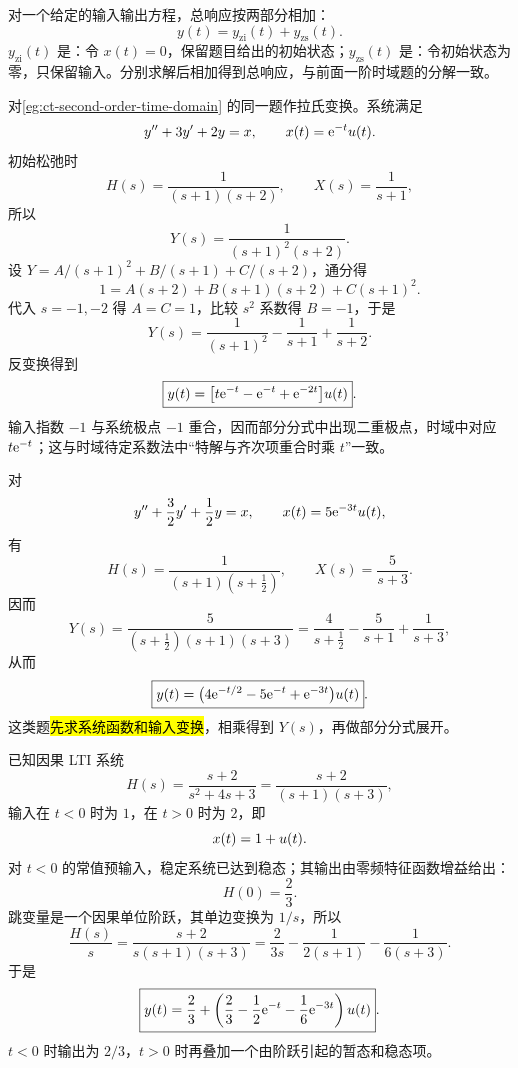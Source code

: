 对一个给定的输入输出方程，总响应按两部分相加：
\begin{equation}
  y(t)=y_{\mathrm{zi}}(t)+y_{\mathrm{zs}}(t).
  \label{eq:laplace-total-response-split}
\end{equation}
$y_{\mathrm{zi}}(t)$ 是：令 $x(t)=0$，保留题目给出的初始状态；$y_{\mathrm{zs}}(t)$ 是：令初始状态为零，只保留输入。分别求解后相加得到总响应，与前面一阶时域题的分解一致。

\begin{example}[重复极点的零状态响应]
\label{eg:laplace-repeated-pole-response}
  对\cref{eg:ct-second-order-time-domain} 的同一题作拉氏变换。系统满足
  \[
    y''+3y'+2y=x,\qquad
    x(t)=\mathrm{e}^{-t}u(t).
  \]
  初始松弛时
  \[
    H(s)=\frac{1}{(s+1)(s+2)},\qquad
    X(s)=\frac{1}{s+1},
  \]
  所以
  \[
    Y(s)=\frac{1}{(s+1)^2(s+2)}.
  \]
  设 $Y=A/(s+1)^2+B/(s+1)+C/(s+2)$，通分得
  \[
    1=A(s+2)+B(s+1)(s+2)+C(s+1)^2.
  \]
  代入 $s=-1,-2$ 得 $A=C=1$，比较 $s^2$ 系数得 $B=-1$，于是
  \[
    Y(s)=\frac{1}{(s+1)^2}-\frac{1}{s+1}+\frac{1}{s+2}.
  \]
  反变换得到
  \[
    \boxed{
    y(t)=\bigl[t\mathrm{e}^{-t}-\mathrm{e}^{-t}+\mathrm{e}^{-2t}\bigr]u(t)}.
  \]
  输入指数 $-1$ 与系统极点 $-1$ 重合，因而部分分式中出现二重极点，时域中对应 $t\mathrm{e}^{-t}$；这与时域待定系数法中“特解与齐次项重合时乘 $t$”一致。
\end{example}

\begin{example}[指数输入与部分分式]
\label{eg:laplace-exponential-input}
  对
  \[
    y''+\frac32y'+\frac12y=x,\qquad
    x(t)=5\mathrm{e}^{-3t}u(t),
  \]
  有
  \[
    H(s)=\frac{1}{(s+1)(s+\frac12)},\qquad
    X(s)=\frac{5}{s+3}.
  \]
  因而
  \[
    Y(s)
    =\frac{5}{(s+\frac12)(s+1)(s+3)}
    =\frac{4}{s+\frac12}-\frac{5}{s+1}+\frac{1}{s+3},
  \]
  从而
  \[
    \boxed{
    y(t)=\bigl(4\mathrm{e}^{-t/2}-5\mathrm{e}^{-t}+\mathrm{e}^{-3t}\bigr)u(t)}.
  \]
  这类题\hl{先求系统函数和输入变换}，相乘得到 $Y(s)$，再做部分分式展开。
\end{example}

\begin{example}[输入发生阶跃变化时的响应]
\label{eg:laplace-step-change-input}
  已知因果 LTI 系统
  \[
    H(s)=\frac{s+2}{s^2+4s+3}
    =\frac{s+2}{(s+1)(s+3)},
  \]
  输入在 $t<0$ 时为 $1$，在 $t>0$ 时为 $2$，即
  \[
    x(t)=1+u(t).
  \]
  对 $t<0$ 的常值预输入，稳定系统已达到稳态；其输出由零频特征函数增益给出：
  \[
    H(0)=\frac23.
  \]
  跳变量是一个因果单位阶跃，其单边变换为 $1/s$，所以
  \[
    \frac{H(s)}{s}
    =\frac{s+2}{s(s+1)(s+3)}
    =\frac{2}{3s}-\frac{1}{2(s+1)}-\frac{1}{6(s+3)}.
  \]
  于是
  \[
    \boxed{
    y(t)=\frac23+
    \left(\frac23-\frac12\mathrm{e}^{-t}-\frac16\mathrm{e}^{-3t}\right)u(t)}.
  \]
  $t<0$ 时输出为 $2/3$，$t>0$ 时再叠加一个由阶跃引起的暂态和稳态项。
\end{example}

